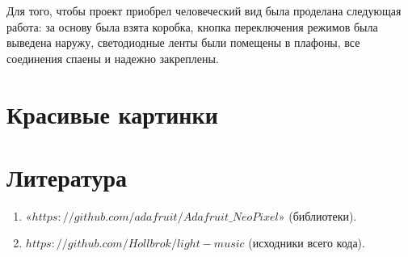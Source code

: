 \documentclass[a4paper, 12pt]{article}%
\begin{document}
Для того, чтобы проект приобрел человеческий вид была проделана следующая работа: за основу была взята коробка, кнопка переключения режимов была выведена наружу, светодиодные ленты были помещены в плафоны, все соединения спаены и надежно закреплены.

\section{Красивые картинки}



\section{Литература}


\begin{enumerate}

\item $«https://github.com/adafruit/Adafruit\_NeoPixel»$  (библиотеки).

\item $https://github.com/Hollbrok/light-music$ (исходники всего кода).

\end{enumerate}	
\end{document}
